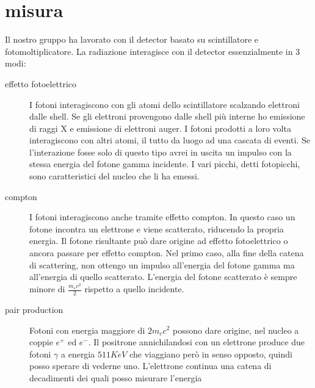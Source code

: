 \documentclass[11pt,a4paper]{article}
\begin{document}
\section{misura}
Il nostro gruppo ha lavorato con il detector basato su scintillatore e fotomoltiplicatore. La radiazione interagisce con il detector essenzialmente in 3 modi:
\begin{description}
  \item[effetto fotoelettrico] I fotoni interagiscono con gli atomi dello scintillatore scalzando elettroni dalle shell. Se gli elettroni provengono dalle shell più interne ho emissione di raggi X e emissione di elettroni auger. I fotoni prodotti a loro volta interagiscono con altri atomi, il tutto da luogo ad una cascata di eventi. Se l'interazione fosse solo di questo tipo avrei in uscita un impulso con la stessa energia del fotone gamma incidente. I vari picchi, detti fotopicchi, sono caratteristici del nucleo che li ha emessi.
  \item[compton] I fotoni interagiscono anche tramite effetto compton. In questo caso un fotone incontra un elettrone e viene scatterato, riducendo la propria energia. Il fotone risultante può dare origine ad effetto fotoelettrico o ancora passare per effetto compton. Nel primo caso, alla fine della catena di scattering, non ottengo un impulso all'energia del fotone gamma ma all'energia di quello scatterato. L'energia del fotone scatterato è sempre minore di $\frac{m_e c^2}{2}$ rispetto a quello incidente.
  \item[pair production] Fotoni con energia maggiore di $2 m_e c^2$ possono dare origine, nel nucleo a coppie $e^+$ ed $e^-$. Il positrone annichilandosi con un elettrone produce due fotoni $\gamma$ a energia $511KeV$ che viaggiano però in senso opposto, quindi posso sperare di vederne uno. L'elettrone continua una catena di decadimenti dei quali posso misurare l'energia
\end{description}
\end{document}
